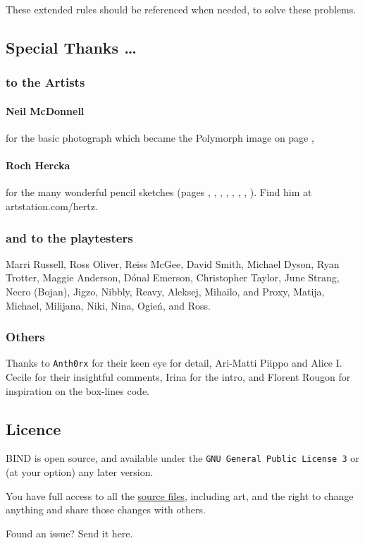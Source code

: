 \begin{multicols}{2}
These extended rules should be referenced when needed, to solve these problems.

\subsection*{Special Thanks \ldots}

\subsubsection*{to the Artists}

\paragraph{Neil McDonnell} for the basic photograph which became the Polymorph image on page \pageref{Roch_Hercka/polymorph},

\paragraph{Roch Hercka} for the many wonderful pencil sketches (pages 
\pageref{Roch_Hercka/cave_fight}, 
\pageref{Roch_Hercka/dwarf_encumbrance}, 
\pageref{Roch_Hercka/vitals_shot}, 
\pageref{Roch_Hercka/stances}, 
\pageref{Roch_Hercka/conjuration_right}, 
\pageref{Roch_Hercka/dwarvish_runes}, 
\pageref{Roch_Hercka/polymorph}, 
\pageref{Roch_Hercka/flashing_light}).
Find him at artstation.com/hertz.

\subsubsection*{and to the playtesters} Marri Russell, Ross Oliver, Reiss McGee, David Smith, Michael Dyson, Ryan Trotter, Maggie Anderson, 
D\'{o}nal Emerson, Christopher Taylor, June Strang, 
Necro (Bojan), Jigzo, Nibbly, Reavy, 
Aleksej, Mihailo, and Proxy,
Matija, Michael, Milijana, Niki, Nina, Ogie\'n,
and Ross.

\subsubsection*{Others}
Thanks to
\texttt{Anth0rx} for their keen eye for detail,
Ari-Matti Piippo and Alice I. Cecile for their insightful comments,
Irina for the intro,
and Florent Rougon for inspiration on the box-lines code.

\subsection*{Licence}

BIND is open source, and available under the {\tt GNU General Public License 3} or (at your option) any later version.

You have full access to all the \href{https://gitlab.com/bindrpg/core}{source files}, including art, and the right to change anything and share those changes with others.

\begin{center}
  
  Found an issue?
  Send it here.
\end{center}

\end{multicols}
